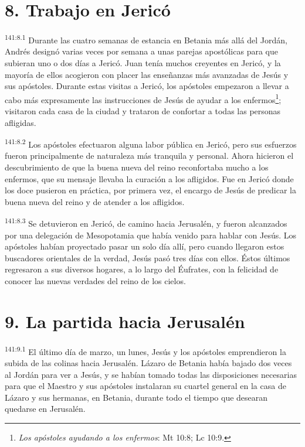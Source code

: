 \section*{8. Trabajo en Jericó}
\par 
\textsuperscript{141:8.1} Durante las cuatro semanas de estancia en Betania más allá del Jordán, Andrés designó varias veces por semana a unas parejas apostólicas para que subieran uno o dos días a Jericó. Juan tenía muchos creyentes en Jericó, y la mayoría de ellos acogieron con placer las enseñanzas más avanzadas de Jesús y sus apóstoles. Durante estas visitas a Jericó, los apóstoles empezaron a llevar a cabo más expresamente las instrucciones de Jesús de ayudar a los enfermos\footnote{\textit{Los apóstoles ayudando a los enfermos}: Mt 10:8; Lc 10:9.}; visitaron cada casa de la ciudad y trataron de confortar a todas las personas afligidas.

\par 
\textsuperscript{141:8.2} Los apóstoles efectuaron alguna labor pública en Jericó, pero sus esfuerzos fueron principalmente de naturaleza más tranquila y personal. Ahora hicieron el descubrimiento de que la buena nueva del reino reconfortaba mucho a los enfermos, que su mensaje llevaba la curación a los afligidos. Fue en Jericó donde los doce pusieron en práctica, por primera vez, el encargo de Jesús de predicar la buena nueva del reino y de atender a los afligidos.

\par 
\textsuperscript{141:8.3} Se detuvieron en Jericó, de camino hacia Jerusalén, y fueron alcanzados por una delegación de Mesopotamia que había venido para hablar con Jesús. Los apóstoles habían proyectado pasar un solo día allí, pero cuando llegaron estos buscadores orientales de la verdad, Jesús pasó tres días con ellos. Éstos últimos regresaron a sus diversos hogares, a lo largo del Éufrates, con la felicidad de conocer las nuevas verdades del reino de los cielos.

\section*{9. La partida hacia Jerusalén}
\par 
\textsuperscript{141:9.1} El último día de marzo, un lunes, Jesús y los apóstoles emprendieron la subida de las colinas hacia Jerusalén. Lázaro de Betania había bajado dos veces al Jordán para ver a Jesús, y se habían tomado todas las disposiciones necesarias para que el Maestro y sus apóstoles instalaran su cuartel general en la casa de Lázaro y sus hermanas, en Betania, durante todo el tiempo que desearan quedarse en Jerusalén.

